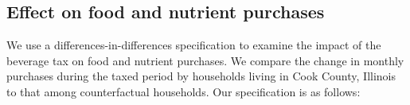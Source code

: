 \documentclass[12pt]{article}
\begin{document}

%
%
%

\subsection{Effect on food and nutrient purchases}

We use a differences-in-differences specification to examine the impact of the beverage tax on food and nutrient purchases. We compare the change in monthly purchases during the taxed period by households living in Cook County, Illinois to that among counterfactual households. Our specification is as follows:
\end{document}
